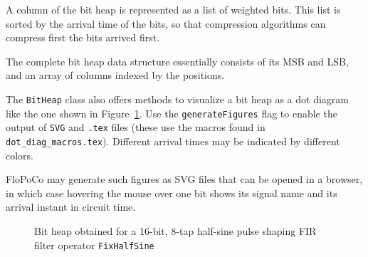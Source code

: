 \documentclass{article}
\begin{document}
A column of the bit heap is represented as a list of weighted bits.
This list is  sorted by the  arrival time of the bits, so that compression algorithms can compress first the bits arrived first.

The complete bit heap data structure essentially consists of its MSB and LSB, and an array of columns indexed by the positions. 

The \texttt{BitHeap} class also offers methods to visualize a bit heap as a dot diagram like the one shown in Figure~\ref{fig:bitheapgallery-halfsine}.
Use the \texttt{generateFigures} flag to enable the output of \texttt{SVG} and \texttt{.tex} files (these use the macros found in \texttt{dot\_diag\_macros.tex}).
Different arrival times may be indicated by different colors.

FloPoCo may generate such figures as SVG files that can be opened in a browser, in which case hovering the mouse over one bit shows its signal name and its arrival instant in circuit time.  


\begin{figure}[t]
  \centering
    \scalebox{0.28} {
      \begin{dotdiag}{20}
        \begin{scope}
        \end{scope}
      \end{dotdiag}
    }
  \caption{Bit heap obtained for a 16-bit, 8-tap half-sine pulse shaping FIR filter operator \texttt{FixHalfSine}}
  \label{fig:bitheapgallery-halfsine}
\end{figure}
\end{document}
